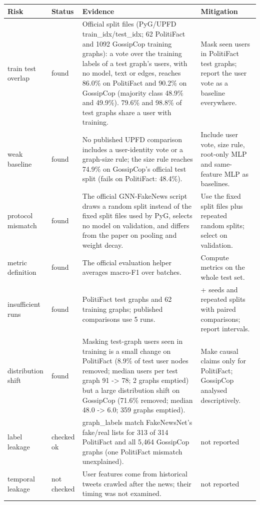 \documentclass[11pt,a4paper]{article}
\begin{document}
{\small
\begin{longtable}{>{\raggedright\arraybackslash}p{}>{\raggedright\arraybackslash}p{}>{\raggedright\arraybackslash}p{}>{\raggedright\arraybackslash}p{}}
\toprule
\textbf{Risk} & \textbf{Status} & \textbf{Evidence} & \textbf{Mitigation} \\
\midrule
\endhead
train test overlap & found & [V] Official split files (PyG/UPFD train\_idx/test\_idx; 62 PolitiFact and 1092 GossipCop training graphs): a vote over the training labels of a test graph's users, with no model, text or edges, reaches 86.0\% on PolitiFact and 90.2\% on GossipCop (majority class 48.9\% and 49.9\%). 79.6\% and 98.8\% of test graphs share a user with training. \cite{dou2021upfd} & Mask seen users in PolitiFact test graphs; report the user vote as a baseline everywhere. \\
weak baseline & found & [V] No published UPFD comparison includes a user-identity vote or a graph-size rule; the size rule reaches 74.9\% on GossipCop's official test split (fails on PolitiFact: 48.4\%). & Include user vote, size rule, root-only MLP and same-feature MLP as baselines. \\
protocol mismatch & found & [V] The official GNN-FakeNews script draws a random split instead of the fixed split files used by PyG, selects no model on validation, and differs from the paper on pooling and weight decay. \cite{dou2021upfd} & Use the fixed split files plus repeated random splits; select on validation. \\
metric definition & found & [V] The official evaluation helper averages macro-F1 over batches. \cite{dou2021upfd} & Compute metrics on the whole test set. \\
insufficient runs & found & [V] 221 PolitiFact test graphs and 62 training graphs; published comparisons use 5 runs. \cite{dou2021upfd} & 10+ seeds and repeated splits with paired comparisons; report intervals. \\
distribution shift & found & [V] Masking test-graph users seen in training is a small change on PolitiFact (8.9\% of test user nodes removed; median users per test graph 91 -> 78; 2 graphs emptied) but a large distribution shift on GossipCop (71.6\% removed; median 48.0 -> 6.0; 359 graphs emptied). & Make causal claims only for PolitiFact; GossipCop analysed descriptively. \\
label leakage & checked ok & [V] graph\_labels match FakeNewsNet's fake/real lists for 313 of 314 PolitiFact and all 5,464 GossipCop graphs (one PolitiFact mismatch unexplained). & not reported \\
temporal leakage & not checked & User features come from historical tweets crawled after the news; their timing was not examined. & not reported \\
\bottomrule
\end{longtable}
}
\end{document}

